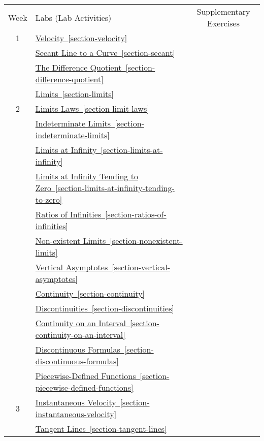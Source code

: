 \documentclass[12pt,]{book}
\theoremstyle{plain}
\theoremstyle{definition}
\numberwithin{equation}{section}
\newcommand{\hrulemedium}{\noalign{\hrule height 0.07em}}
\newcommand{\hrulethick} {\noalign{\hrule height 0.11em}}
\begin{document}
\begin{longtable}{clc}\\
\hrulethick
Week&Labs (Lab Activities)&Supplementary Exercises\\\hrulemedium
1&\hyperref[section-velocity]{Velocity~\ref*{section-velocity}}&\\
&\hyperref[section-secant]{Secant Line to a Curve~\ref*{section-secant}}&\\
&\hyperref[section-difference-quotient]{The Difference Quotient~\ref*{section-difference-quotient}}&\\
&\hyperref[section-limits]{Limits~\ref*{section-limits}}&\\\hrulemedium
2&\hyperref[section-limit-laws]{Limits Laws~\ref*{section-limit-laws}}&\\
&\hyperref[section-indeterminate-limits]{Indeterminate Limits~\ref*{section-indeterminate-limits}}&\\
&\hyperref[section-limits-at-infinity]{Limits at Infinity~\ref*{section-limits-at-infinity}}&\\
&\hyperref[section-limits-at-infinity-tending-to-zero]{Limits at Infinity Tending to Zero~\ref*{section-limits-at-infinity-tending-to-zero}}&\\
&\hyperref[section-ratios-of-infinities]{Ratios of Infinities~\ref*{section-ratios-of-infinities}}&\\
&\hyperref[section-nonexistent-limits]{Non-existent Limits~\ref*{section-nonexistent-limits}}&\\
&\hyperref[section-vertical-asymptotes]{Vertical Asymptotes~\ref*{section-vertical-asymptotes}}&\\
&\hyperref[section-continuity]{Continuity~\ref*{section-continuity}}&\\
&\hyperref[section-discontinuities]{Discontinuities~\ref*{section-discontinuities}}&\\
&\hyperref[section-continuity-on-an-interval]{Continuity on an Interval~\ref*{section-continuity-on-an-interval}}&\\
&\hyperref[section-discontinuous-formulas]{Discontinuous Formulas~\ref*{section-discontinuous-formulas}}&\\
&\hyperref[section-piecewise-defined-functions]{Piecewise-Defined Functions~\ref*{section-piecewise-defined-functions}}&\\\hrulemedium
3&\hyperref[section-instantaneous-velocity]{Instantaneous Velocity~\ref*{section-instantaneous-velocity}}&\\
&\hyperref[section-tangent-lines]{Tangent Lines~\ref*{section-tangent-lines}}&\\

\end{longtable}
\end{document}
